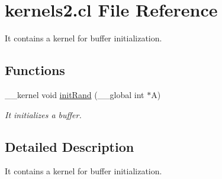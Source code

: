 \hypertarget{kernels2_8cl}{}\section{kernels2.\+cl File Reference}
\label{kernels2_8cl}


It contains a kernel for buffer initialization.  


\subsection*{Functions}
\begin{DoxyCompactItemize}
\item 
\+\_\+\+\_\+kernel void \hyperlink{kernels2_8cl_a6492bce4361004090b61f519f83482b4}{init\+Rand} (\+\_\+\+\_\+global int $\ast$A)
\begin{DoxyCompactList}\small\item\em It initializes a buffer. \end{DoxyCompactList}\end{DoxyCompactItemize}


\subsection{Detailed Description}
It contains a kernel for buffer initialization. 

